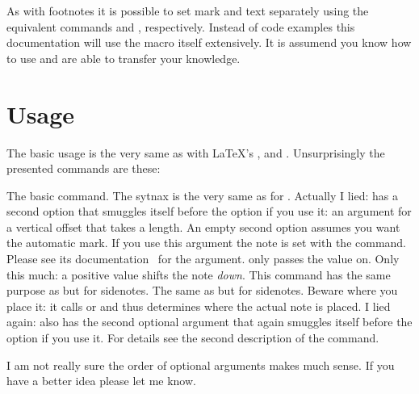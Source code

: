 \documentclass[toc=index,toc=bib,mpinclude]{cnpkgdoc}
\begin{document}
As with footnotes it is possible to set mark and text separately using the
equivalent commands  and , respectively.
Instead of code examples this documentation will use the  macro
itself extensively. It is assumend you know how to use  and are
able to transfer your knowledge.

\section{Usage}
The basic usage is the very same as with \LaTeX's , 
and . Unsurprisingly the presented commands are these:
\begin{beschreibung}
 \newline
   The basic command. The sytnax is the very same as for .
 \newline
   Actually I lied:  has a second option that smuggles itself
   before the  option if you use it: an argument for a vertical offset
   that takes a length. An empty second option assumes you want the automatic
   mark. If you use this argument the note is set with the 
   command.
   Please see its documentation~\cite{pkg:marginnote} for the 
   argument. \snotez only passes the value on. Only this much: a positive value
   shifts the note \emph{down}.
 \newline
   This command has the same purpose as  but for sidenotes.
 \newline
   The same as  but for sidenotes. Beware where you place it:
   it calls  or  and thus determines where the
   actual note is placed.
 \newline
   I lied again:  also has the second optional argument
    that again smuggles itself before the  option if you
   use it. For details see the second description of the  command.
\end{beschreibung}
I am not really sure the order of optional arguments makes much sense. If you
have a better idea please let me know.
\end{document}
